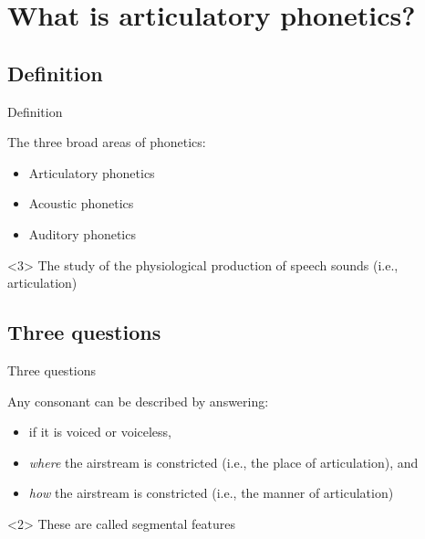 \documentclass{beamer}
\subtitle[Consonant Articulation]{Articulation of English Consonants}
\newcommand{\suboneone}{Definition}
\newcommand{\subonetwo}{Three questions}
\begin{document}
  

  \section{What is articulatory phonetics?}
    \subsection{\suboneone}
      \begin{frame}{\suboneone}
        \begin{block}{}
          The three broad areas of phonetics:
          \begin{itemize}
            \item \alert<2->{Articulatory phonetics}
            \item Acoustic phonetics
            \item Auditory phonetics
          \end{itemize}
        \end{block}
        \begin{definition}<3>
          The study of the physiological production of speech sounds (i.e., \alert{articulation})
        \end{definition}
      \end{frame}

    \subsection{\subonetwo}
      \begin{frame}{\subonetwo}
        \begin{block}{}
          Any consonant can be described by answering:
          \begin{itemize}
            \item if it is \alert{voiced} or \alert{voiceless},
            \item \emph{where} the airstream is constricted (i.e., the \alert{place of articulation}), and
            \item \emph{how} the airstream is constricted (i.e., the \alert{manner of articulation})
          \end{itemize}
        \end{block}
        \begin{alertblock}<2>{}
          These are called \alert{segmental features}
        \end{alertblock}
      \end{frame}
\end{document}
